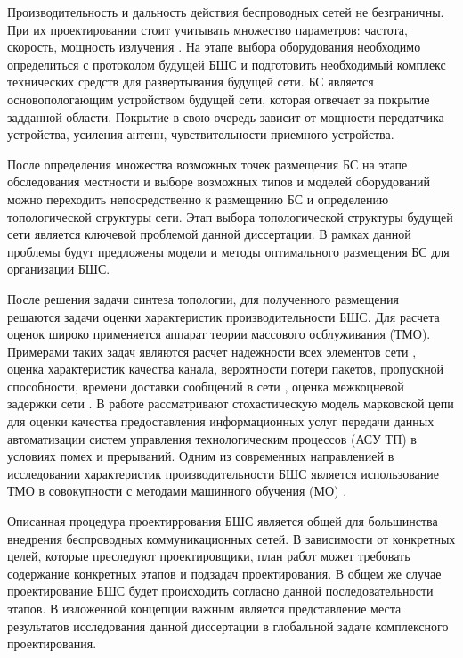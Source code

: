 Производительность и дальность действия беспроводных сетей не безграничны. При их проектировании стоит учитывать множество параметров: частота, скорость, мощность излучения \cite{Proletarsky}. На этапе выбора оборудования необходимо определиться с протоколом будущей БШС и  подготовить необходимый комплекс технических средств для развертывания будущей сети. БС является основопологающим устройством будущей сети, которая отвечает за покрытие задданной области. Покрытие в свою очередь зависит от мощности передатчика устройства, усиления антенн, чувствительности приемного устройства.


После определения множества возможных точек размещения БС на этапе обследования местности и выборе возможных типов и моделей оборудований можно переходить непосредственно к размещению БС и определению топологической структуры сети. Этап выбора топологической структуры будущей сети является ключевой проблемой данной диссертации. В рамках данной проблемы будут предложены модели и методы оптимального размещения БС для организации БШС.

После решения задачи синтеза топологии, для полученного размещения решаются задачи оценки характеристик производительности БШС. Для расчета оценок широко применяется аппарат теории массового осблуживания (ТМО). Примерами таких задач являются расчет надежности всех элементов сети \cite{Wankpo2020, Krishnamoorthy2021, Kozyrev2019}, оценка характеристик качества канала, вероятности потери пакетов, пропускной способности, времени доставки сообщений в сети \cite{Gorbunova2020, Larionov2019, Vishnevsky2016_Methods_of_performance, Vishnevsky2016_Review_of_methodology, Wang2017, Sandmann2012, Baumann2017}, оценка межкоцневой задержки сети \cite{Wang2017, Sandmann2012}. В работе \cite{Eremenko2013} рассматривают стохастическую модель марковской цепи для оценки качества предоставления информационных услуг передачи данных автоматизации систем управления технологическим процессов (АСУ ТП) в условиях помех и прерываний. Одним из современных направленией в исследовании характеристик производительности БШС является использование ТМО в совокупности с методами машинного обучения (МО) \cite{Lovas2021, SatyaHermanto2018}.

Описанная процедура проектиррования БШС является общей для большинства внедрения беспроводных коммуникационных сетей. В зависимости от конкретных целей, которые преследуют проектировщики, план работ может требовать содержание конкретных этапов и подзадач проектирования. В общем же случае проектирование БШС будет происходить согласно данной последовательности этапов. В изложенной концепции важным является представление места результатов исследования данной диссертации в глобальной задаче комплексного проектирования.

